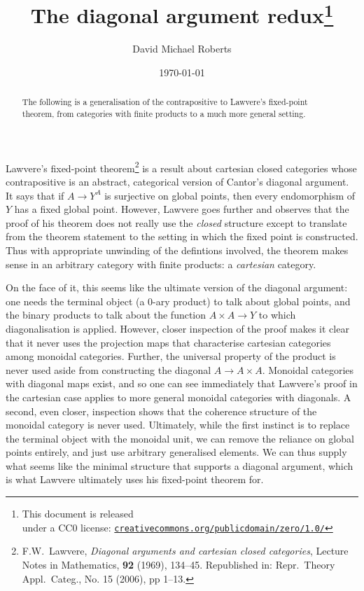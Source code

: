 \documentclass{tufte-handout}
\title{The diagonal argument redux\thanks{This document is released \\ under a CC0 license: \href{http://creativecommons.org/publicdomain/zero/1.0/}{\texttt{creativecommons.org/publicdomain/zero/1.0/}}}}
\author{David Michael Roberts}
\date{\today}
\theoremstyle{definition}
\begin{document}
\maketitle

\begin{abstract}
The following is a generalisation of the contrapositive to Lawvere's fixed-point theorem, from categories with finite products to a much more general setting.\end{abstract}

Lawvere's fixed-point theorem\footnote{F.W.~Lawvere, \emph{Diagonal arguments and cartesian closed categories}, Lecture Notes in Mathematics, \textbf{92} (1969), 134--45. Republished in:
Repr.\ Theory Appl.\ Categ., No. 15 (2006), pp 1--13.} is a result about cartesian closed categories whose contrapositive is an abstract, categorical version of Cantor's diagonal argument.
It says that if $A \to Y^A$ is surjective on global points, then every endomorphism of $Y$ has a fixed global point.
However, Lawvere goes further and observes that the proof of his theorem does not really use the \emph{closed} structure except to translate from the theorem statement to the setting in which the fixed point is constructed.
Thus with appropriate unwinding of the defintions involved, the theorem makes sense in an arbitrary category with finite products: a \emph{cartesian} category.

On the face of it, this seems like the ultimate version of the diagonal argument: one needs the terminal object (a $0$-ary product) to talk about global points, and the binary products to talk about the function $A\times A \to Y$ to which diagonalisation is applied.
However, closer inspection of the proof makes it clear that it never uses the projection maps that characterise cartesian categories among monoidal categories.
Further, the universal property of the product is never used aside from constructing the diagonal $A\to A\times A$. 
Monoidal categories with diagonal maps exist, and so one can see immediately that Lawvere's proof in the cartesian case applies to more general monoidal categories with diagonals.
A second, even closer, inspection shows that the coherence structure of the monoidal category is never used.
Ultimately, while the first instinct is to replace the terminal object with the monoidal unit, we can remove the reliance on global points entirely, and just use arbitrary generalised elements.
We can thus supply what seems like the minimal structure that supports a diagonal argument, which is what Lawvere ultimately uses his fixed-point theorem for.
\end{document}
